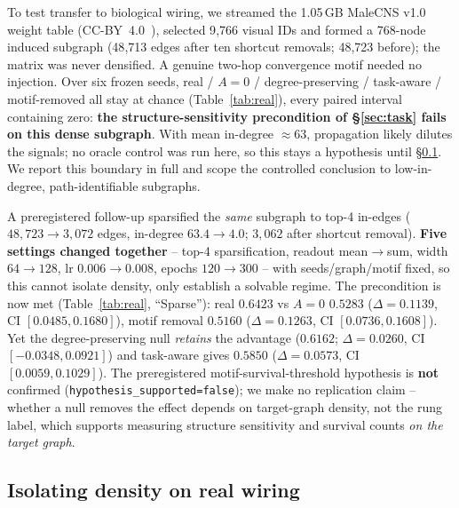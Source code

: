 \documentclass[10pt,twocolumn,letterpaper]{article}
\begin{document}
To test transfer to biological wiring, we streamed the 1.05\,GB MaleCNS v1.0
weight table (CC-BY~4.0~\cite{malecns2026}), selected 9{,}766 visual IDs and
formed a 768-node induced subgraph (48{,}713 edges after ten shortcut removals;
48{,}723 before); the matrix was never densified. A genuine two-hop convergence
motif needed no injection. Over six frozen seeds, real / $A\!=\!0$ /
degree-preserving / task-aware / motif-removed all stay at chance
(Table~\ref{tab:real}), every paired interval containing zero: \textbf{the
structure-sensitivity precondition of \S\ref{sec:task} fails on this dense
subgraph}. With mean in-degree $\approx\!63$, propagation likely dilutes the
signals; no oracle control was run here, so this stays a hypothesis until
\S\ref{sec:density}. We report this boundary in full and scope the controlled
conclusion to low-in-degree, path-identifiable subgraphs.

A preregistered follow-up sparsified the \emph{same} subgraph to top-4
in-edges ($48{,}723\to3{,}072$ edges, in-degree $63.4\to4.0$; $3{,}062$ after
shortcut removal). \textbf{Five settings changed together} -- top-4
sparsification, readout mean$\to$sum, width $64\!\to\!128$, lr
$0.006\!\to\!0.008$, epochs $120\!\to\!300$ -- with seeds/graph/motif fixed, so
this cannot isolate density, only establish a solvable regime. The precondition
is now met (Table~\ref{tab:real}, ``Sparse''): real $0.6423$ vs $A\!=\!0$
$0.5283$ ($\Delta=0.1139$, CI $[0.0485,0.1680]$), motif removal $0.5160$
($\Delta=0.1263$, CI $[0.0736,0.1608]$). Yet the degree-preserving null
\emph{retains} the advantage ($0.6162$; $\Delta=0.0260$, CI
$[-0.0348,0.0921]$) and task-aware gives $0.5850$ ($\Delta=0.0573$, CI
$[0.0059,0.1029]$). The preregistered motif-survival-threshold hypothesis is
\textbf{not} confirmed (\texttt{hypothesis\_supported=false}); we make no
replication claim -- whether a null removes the effect depends on target-graph
density, not the rung label, which supports measuring structure sensitivity
and survival counts \emph{on the target graph}.

\subsection{Isolating density on real wiring}
\label{sec:density}
\end{document}
